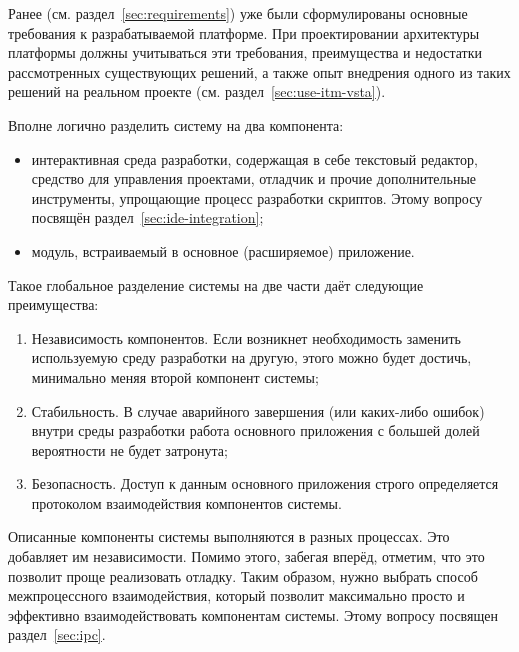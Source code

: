 Ранее (см. раздел~\ref{sec:requirements}) уже были сформулированы основные требования к разрабатываемой платформе. При проектировании архитектуры платформы должны учитываться эти требования, преимущества и недостатки рассмотренных существующих решений, а также опыт внедрения одного из таких решений на реальном проекте (см. раздел~\ref{sec:use-itm-vsta}).

Вполне логично разделить систему на два компонента:
\begin{itemize}
 \item интерактивная среда разработки, содержащая в себе текстовый редактор, средство для управления проектами, отладчик и прочие дополнительные инструменты, упрощающие процесс разработки скриптов. Этому вопросу посвящён раздел~\ref{sec:ide-integration};
 \item модуль, встраиваемый в основное (расширяемое) приложение.
\end{itemize}

Такое глобальное разделение системы на две части даёт следующие преимущества:
\begin{enumerate}
 \item Независимость компонентов. Если возникнет необходимость заменить используемую среду разработки на другую, этого можно будет достичь, минимально меняя второй компонент системы;
 \item Стабильность. В случае аварийного завершения (или каких-либо ошибок) внутри среды разработки работа основного приложения с большей долей вероятности не будет затронута;
 \item Безопасность. Доступ к данным основного приложения строго определяется протоколом взаимодействия компонентов системы.
\end{enumerate}

Описанные компоненты системы выполняются в разных процессах. Это добавляет им независимости. Помимо этого, забегая вперёд, отметим, что это позволит проще реализовать отладку. Таким образом, нужно выбрать способ межпроцессного взаимодействия, который позволит максимально просто и эффективно взаимодействовать компонентам системы. Этому вопросу посвящен раздел~\ref{sec:ipc}.
